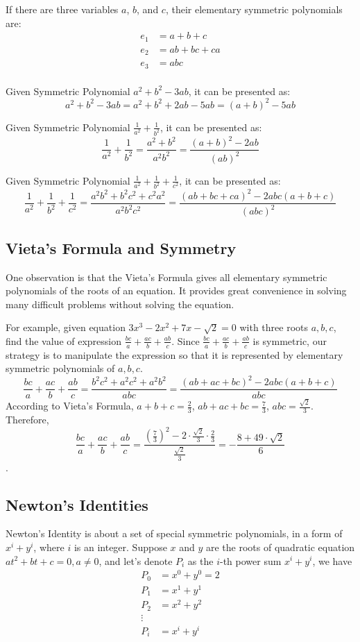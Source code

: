 \documentclass[11pt, oneside]{article}   	%
\begin{document}
If there are three variables $a$, $b$, and $c$, their elementary symmetric polynomials are: 
\begin{align*}
e_1 &=a+b+c\\
e_2 &=ab+bc+ca\\
e_3 &=abc \\
\end{align*}

Given Symmetric Polynomial $a^2+b^2-3ab$, it can be presented as:
\[a^2+b^2-3ab = a^2+b^2+2ab-5ab=(a+b)^2-5ab\]

Given Symmetric Polynomial $\frac{1}{a^2}+\frac{1}{b^2}$, it can be presented as:
\[\frac{1}{a^2}+\frac{1}{b^2}=\frac{a^2+b^2}{a^2 b^2}=\frac{(a+b)^2-2ab}{(ab)^2}\] 

Given Symmetric Polynomial $\frac{1}{a^2}+\frac{1}{b^2}+\frac{1}{c^2}$, it can be presented as:
\[\frac{1}{a^2}+\frac{1}{b^2}+\frac{1}{c^2}=\frac{a^2b^2+b^2c^2+c^2a^2}{a^2 b^2c^2}=\frac{(ab+bc+ca)^2-2abc(a+b+c)}{(abc)^2}\] 

\subsection{Vieta's Formula and Symmetry} 
One observation is that the Vieta's Formula gives all elementary symmetric polynomials of the roots of an equation. It provides great convenience in solving many difficult problems without solving the equation. 

For example, given equation $3x^3-2x^2+7x-\sqrt{2}=0$ with three roots $a, b, c$, find the value of expression $\frac{bc}{a}+\frac{ac}{b}+\frac{ab}{c}$. Since $\frac{bc}{a}+\frac{ac}{b}+\frac{ab}{c}$ is symmetric, our strategy is to manipulate the expression so that it is represented by elementary symmetric polynomials of $a, b, c$. 
\[\frac{bc}{a}+\frac{ac}{b}+\frac{ab}{c} = \frac{b^2c^2+a^2c^2+a^2b^2}{abc}=\frac{(ab+ac+bc)^2-2abc(a+b+c)}{abc}\] 
According to Vieta's Formula, $a+b+c=\frac{2}{3}$, $ab+ac+bc=\frac{7}{3}$, $abc=\frac{\sqrt{2}}{3}$. 
Therefore, \[\frac{bc}{a}+\frac{ac}{b}+\frac{ab}{c} = \frac{(\frac{7}{3})^2-2\cdot\frac{\sqrt{2}}{3}\cdot\frac{2}{3}}{\frac{\sqrt{2}}{3}} = -\frac{8+49\cdot\sqrt{2}}{6}\].

\subsection{Newton's Identities} 
Newton's Identity is about a set of special symmetric polynomials, in a form of $x^i+y^i$, where $i$ is an integer. Suppose $x$ and $y$ are the roots of quadratic equation $at^2 + bt + c=0, a \ne 0$, and let's denote $P_i$ as the $i$-th power sum $x^i+y^i$, we have 
\begin{align*}
P_0 & =x^0+y^0=2\\
P_1 & =x^1+y^1 \\
P_2 & =x^2+y^2\\
\vdots \\
P_i & =x^i+y^i 
\end{align*}
\end{document}
